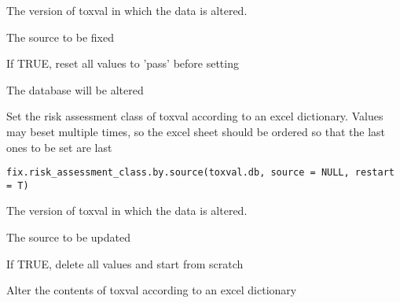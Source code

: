 \documentclass[letterpaper]{book}
\begin{document}
%
\begin{Arguments}
\begin{ldescription}
\item[\code{toxval.db}] The version of toxval in which the data is altered.

\item[\code{source}] The source to be fixed

\item[\code{reset}] If TRUE, reset all values to 'pass' before setting
\end{ldescription}
\end{Arguments}
%
\begin{Value}
The database will be altered
\end{Value}
%
\begin{Description}\relax
Set the risk assessment class of toxval according to an excel dictionary.
Values may beset multiple times, so the excel sheet should be ordered so that
the last ones to be set are last
\end{Description}
%
\begin{Usage}
\begin{verbatim}
fix.risk_assessment_class.by.source(toxval.db, source = NULL, restart = T)
\end{verbatim}
\end{Usage}
%
\begin{Arguments}
\begin{ldescription}
\item[\code{toxval.db}] The version of toxval in which the data is altered.

\item[\code{source}] The source to be updated

\item[\code{restart}] If TRUE, delete all values and start from scratch
\end{ldescription}
\end{Arguments}
%
\begin{Description}\relax
Alter the contents of toxval according to an excel dictionary
\end{Description}
\end{document}

